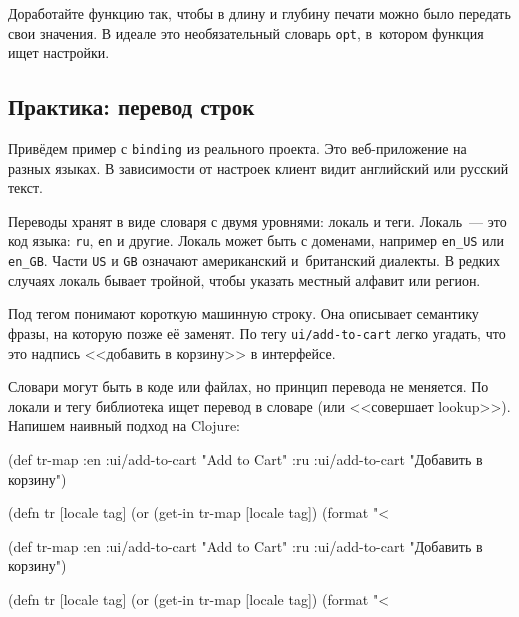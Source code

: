 
Доработайте функцию так, чтобы в длину и глубину печати можно было передать свои
значения. В идеале это необязательный словарь \verb|opt|, в~котором функция ищет
настройки.

\subsection{Практика: перевод строк}

\label{translate}

Привёдем пример с \verb|binding| из реального проекта. Это веб-приложение на
разных языках. В зависимости от настроек клиент видит английский или русский
текст.


Переводы хранят в виде словаря с двумя уровнями: локаль и теги. Локаль~--- это код
языка: \verb|ru|, \verb|en| и другие. Локаль может быть с доменами, например
\verb|en_US| или \verb|en_GB|. Части \verb|US| и \verb|GB| означают
американский и~британский диалекты. В редких случаях локаль бывает тройной,
чтобы указать местный алфавит или регион.

Под тегом понимают короткую машинную строку. Она описывает семантику фразы, на
которую позже её заменят. По тегу \verb|ui/add-to-cart| легко угадать, что
это надпись <<добавить в корзину>> в интерфейсе.

Словари могут быть в коде или файлах, но принцип перевода не меняется. По локали
и тегу библиотека ищет перевод в словаре (или <<совершает lookup>>). Напишем
наивный подход на Clojure:

\ifx\DEVICETYPE\MOBILE

  \begin{clojure}
(def tr-map
  {:en {:ui/add-to-cart "Add to Cart"}
   :ru {:ui/add-to-cart
        "Добавить в корзину"}})

(defn tr [locale tag]
  (or (get-in tr-map [locale tag])
      (format "<%
  \end{clojure}

\else

  \begin{clojure}
(def tr-map
  {:en {:ui/add-to-cart "Add to Cart"}
   :ru {:ui/add-to-cart "Добавить в корзину"}})

(defn tr [locale tag]
  (or (get-in tr-map [locale tag])
      (format "<%
  \end{clojure}

